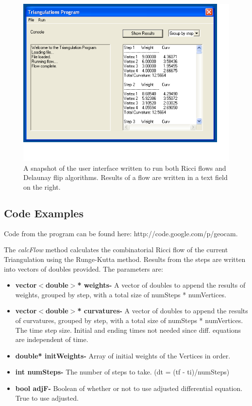 \documentclass[12pt]{article}
\begin{document}
\begin{figure}
\begin{center}
\includegraphics[scale = 0.65]{Pictures3/GUIpic.png}
\caption{A snapshot of the user interface written to run both Ricci flows and Delaunay flip algorithms. Results of a flow are written in a text field on the right.}
\end{center}
\end{figure}

\subsection{Code Examples}
Code from the program can be found here: http://code.google.com/p/geocam. 
 
The \textit{calcFlow} method calculates the combinatorial Ricci flow of the current Triangulation using the Runge-Kutta method. Results from the steps are written into vectors of doubles provided. The parameters are:

\begin{itemize}
\item\textbf{vector$<$double$>$* weights-} A vector of doubles to append the results of weights, grouped by step, with a total size of numSteps * numVertices.
\item\textbf{vector$<$double$>$* curvatures-} A vector of doubles to append the results of curvatures, grouped by step, with a total size of numSteps * numVertices. The time step size. Initial and ending times not needed since diff. equations are independent of time.
\item\textbf{double* initWeights-} Array of initial weights of the Vertices in order.
\item\textbf{int numSteps-} The number of steps to take. (dt = (tf - ti)/numSteps)
\item\textbf{bool adjF-} Boolean of whether or not to use adjusted differential equation. True to use adjusted.
\end{itemize}
\end{document}
